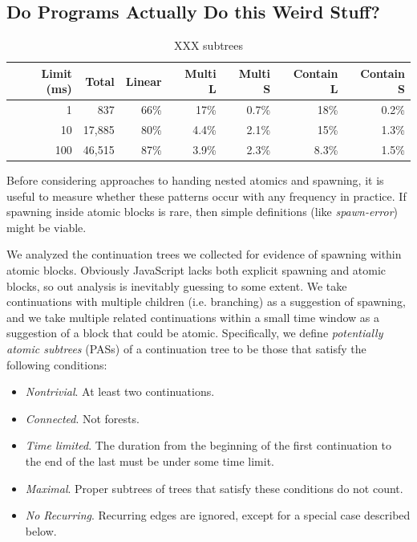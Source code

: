 \documentclass[acmsmall,anonymous,review]{acmart}\settopmatter{printfolios=true,printccs=false,printacmref=false}
\begin{document}

\subsection{Do Programs Actually Do this Weird Stuff?}

\begin{table}
  \centering
  \begin{tabular}{|r|r|r|r|r|r|r|}
    \hline
    Limit (ms) &  Total & Linear & Multi L & Multi S & Contain L & Contain S \\
    \hline
    1          &    837 &   66\% &    17\% &   0.7\% &      18\% &     0.2\% \\
    \hline
    10         & 17,885 &   80\% &   4.4\% &   2.1\% &      15\% &     1.3\% \\
    \hline
    100        & 46,515 &   87\% &   3.9\% &   2.3\% &     8.3\% &     1.5\% \\
    \hline
  \end{tabular}
  \caption{XXX subtrees}
  \label{table:subtrees}
\end{table}

Before considering approaches to handing nested atomics and spawning, it is useful to measure whether these patterns occur with any frequency in practice.
If spawning inside atomic blocks is rare, then simple definitions (like \emph{spawn-error}) might be viable.

We analyzed the continuation trees we collected for evidence of spawning within atomic blocks.
Obviously JavaScript lacks both explicit spawning and atomic blocks, so out analysis is inevitably guessing to some extent.
We take continuations with multiple children (i.e. branching) as a suggestion of spawning, and we take multiple related continuations within a small time window as a suggestion of a block that could be atomic.
Specifically, we define \emph{potentially atomic subtrees} (PASs) of a continuation tree to be those that satisfy the following conditions:

\begin{itemize}
\item \emph{Nontrivial}. At least two continuations.
\item \emph{Connected}. Not forests.
\item \emph{Time limited}. The duration from the beginning of the first continuation to the end of the last must be under some time limit.
\item \emph{Maximal}. Proper subtrees of trees that satisfy these conditions do not count.
\item \emph{No Recurring}. Recurring edges are ignored, except for a special case described below.
\end{itemize}
\end{document}
